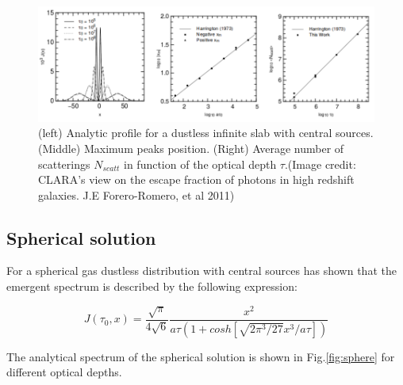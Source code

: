 \begin{figure}[H]
\begin{center}
\includegraphics[scale=0.4]{../Figures/slab.png}
\end{center}\caption{(left) Analytic profile for a dustless infinite slab with central
\ly sources. (Middle) Maximum peaks position. (Right) Average number of 
scatterings $N_{scatt}$ in function of the optical depth $\tau$.(Image credit:  CLARA's view on the escape fraction of \ly photons in high redshift galaxies. J.E Forero-Romero, et al 2011)\label{fig:slab}}
\end{figure}

\subsection{Spherical solution}

For a spherical gas dustless distribution with central \ly sources \citep{Dijkstra06} has shown that the emergent spectrum is described by the following expression:

\begin{equation}
J(\tau_0, x) = \dfrac{\sqrt{\pi}}{4\sqrt{6}}\dfrac{x^2}{a\tau (1+cosh[\sqrt{2\pi^3/27}x^3/a\tau])}
\end{equation}

The analytical spectrum of the spherical solution 
is shown in Fig.\ref{fig:sphere} for different optical depths. 

